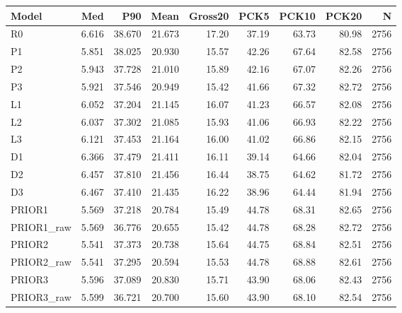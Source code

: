 \begin{longtable}{lrrrrrrrr}\toprule Model & Med & P90 & Mean & Gross20 & PCK5 & PCK10 & PCK20 & N\\\midrule\endhead
R0 & 6.616 & 38.670 & 21.673 & 17.20 & 37.19 & 63.73 & 80.98 & 2756 \\
P1 & 5.851 & 38.025 & 20.930 & 15.57 & 42.26 & 67.64 & 82.58 & 2756 \\
P2 & 5.943 & 37.728 & 21.010 & 15.89 & 42.16 & 67.07 & 82.26 & 2756 \\
P3 & 5.921 & 37.546 & 20.949 & 15.42 & 41.66 & 67.32 & 82.72 & 2756 \\
L1 & 6.052 & 37.204 & 21.145 & 16.07 & 41.23 & 66.57 & 82.08 & 2756 \\
L2 & 6.037 & 37.302 & 21.085 & 15.93 & 41.06 & 66.93 & 82.22 & 2756 \\
L3 & 6.121 & 37.453 & 21.164 & 16.00 & 41.02 & 66.86 & 82.15 & 2756 \\
D1 & 6.366 & 37.479 & 21.411 & 16.11 & 39.14 & 64.66 & 82.04 & 2756 \\
D2 & 6.457 & 37.810 & 21.456 & 16.44 & 38.75 & 64.62 & 81.72 & 2756 \\
D3 & 6.467 & 37.410 & 21.435 & 16.22 & 38.96 & 64.44 & 81.94 & 2756 \\
PRIOR1 & 5.569 & 37.218 & 20.784 & 15.49 & 44.78 & 68.31 & 82.65 & 2756 \\
PRIOR1\_raw & 5.569 & 36.776 & 20.655 & 15.42 & 44.78 & 68.28 & 82.72 & 2756 \\
PRIOR2 & 5.541 & 37.373 & 20.738 & 15.64 & 44.75 & 68.84 & 82.51 & 2756 \\
PRIOR2\_raw & 5.541 & 37.295 & 20.594 & 15.53 & 44.78 & 68.88 & 82.61 & 2756 \\
PRIOR3 & 5.596 & 37.089 & 20.830 & 15.71 & 43.90 & 68.06 & 82.43 & 2756 \\
PRIOR3\_raw & 5.599 & 36.721 & 20.700 & 15.60 & 43.90 & 68.10 & 82.54 & 2756 \\
\bottomrule\end{longtable}
